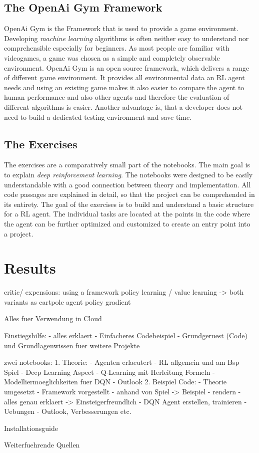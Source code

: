 \documentclass[a4paper]{article}
\begin{document}
		\subsection{The OpenAi Gym Framework}
		OpenAi Gym is the Framework that is used to provide a game environment. Developing \textit{machine learning} algorithms is often neither easy to understand nor comprehensible especially for beginners. As most people are familiar with videogames, a game was chosen as a simple and completely observable environment. OpenAi Gym is an open source framework, which delivers a range of different game environment. It provides all environmental data an RL agent needs and using an existing game makes it also easier to compare the agent to human performance and also other agents and therefore the evaluation of different algorithms is easier.
		Another advantage is, that a developer does not need to build a dedicated testing environment and save time.
		
		\subsection{The Exercises}
		The exercises are a comparatively small part of the notebooks. The main goal is to explain \textit{deep reinforcement learning}. The notebooks were designed to be easily understandable with a good connection between theory and implementation. All code passages are explained in detail, so that the project can be comprehended in its entirety. The goal of the exercises is to build and understand a basic structure for a RL agent. The individual tasks are located at the points in the code where the agent can be further optimized and customized to create an entry point into a project.
	
	\section{Results}
	critic/ expensions:
		using a framework
		policy learning / value learning -> both variants as cartpole agent
		policy gradient
	
	Alles fuer Verwendung in Cloud
	
	Einstiegshilfe: 
		- alles erklaert
		- Einfacheres Codebeispiel
		- Grundgeruest (Code) und Grundlagenwissen fuer weitere Projekte
	
	zwei notebooks:
		1. Theorie: 
			- Agenten erlaeutert
			- RL allgemein und am Bsp Spiel	
			- Deep Learning Aspect
			- Q-Learning mit Herleitung Formeln
			- Modelliermoeglichkeiten fuer DQN
			- Outlook
		2. Beispiel Code:
			- Theorie umgesetzt
			- Framework vorgestellt
			- anhand von Spiel -> Beispiel
			- rendern 
			- alles genau erklaert -> Einsteigerfreundlich
			- DQN Agent erstellen, trainieren
			- Uebungen
			- Outlook, Verbesserungen etc.
			
	Installationsguide
	
	Weiterfuehrende Quellen
	
	 
	
\end{document}
